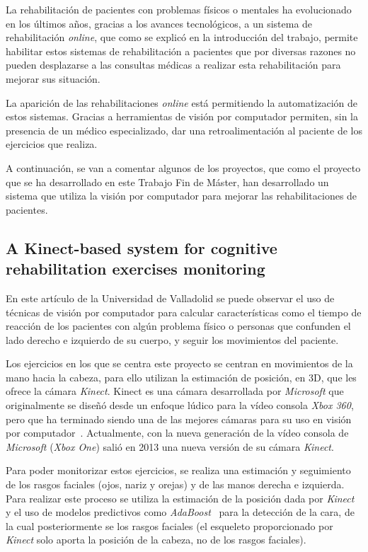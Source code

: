 
La rehabilitación de pacientes con problemas físicos o mentales ha evolucionado en los últimos años, gracias a los avances tecnológicos, a un sistema de rehabilitación \textit{online}, que como se explicó en la introducción del trabajo, permite habilitar estos sistemas de rehabilitación a pacientes que por diversas razones no pueden desplazarse a las consultas médicas a realizar esta rehabilitación para mejorar sus situación.

La aparición de las rehabilitaciones \textit{online} está permitiendo la automatización de estos sistemas. Gracias a herramientas de visión por computador permiten, sin la presencia de un médico especializado, dar una retroalimentación al paciente de los ejercicios que realiza.

A continuación, se van a comentar algunos de los proyectos, que como el proyecto que se ha desarrollado en este Trabajo Fin de Máster, han desarrollado un sistema que utiliza la visión por computador para mejorar las rehabilitaciones de pacientes.

\subsection{A Kinect-based system for cognitive rehabilitation exercises monitoring~\cite{kinectbasedsystem}}
En este artículo de la Universidad de Valladolid se puede observar el uso de técnicas de visión por computador para calcular características como el tiempo de reacción de los pacientes con algún problema físico o personas que confunden el lado derecho e izquierdo de su cuerpo, y seguir los movimientos del paciente.

Los ejercicios en los que se centra este proyecto se centran en movimientos de la mano hacia la cabeza, para ello utilizan la estimación de posición, en 3D, que les ofrece la cámara \textit{Kinect}. Kinect es una cámara desarrollada por \textit{Microsoft} que originalmente se diseñó desde un enfoque lúdico para la vídeo consola \textit{Xbox 360}, pero que ha terminado siendo una de las mejores cámaras para su uso en visión por computador~\cite{wiki:kinect}. Actualmente, con la nueva generación de la vídeo consola de \textit{Microsoft} (\textit{Xbox One}) salió en 2013 una nueva versión de su cámara \textit{Kinect}.

Para poder monitorizar estos ejercicios, se realiza una estimación y seguimiento de los rasgos faciales (ojos, nariz y orejas) y de las manos derecha e izquierda. Para realizar este proceso se utiliza la estimación de la posición dada por \textit{Kinect} y el uso de modelos predictivos como \textit{AdaBoost}~\cite{ada} para la detección de la cara, de la cual posteriormente se los rasgos faciales (el esqueleto proporcionado por \textit{Kinect} solo aporta la posición de la cabeza, no de los rasgos faciales).

